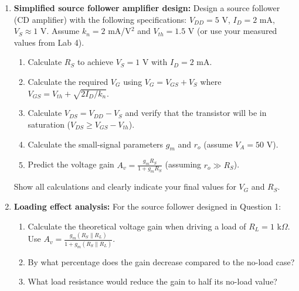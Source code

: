 \documentclass[10pt]{article}
\begin{document}
\begin{enumerate}
    
    \item \textbf{Simplified source follower amplifier design:} Design a source follower (CD amplifier) with the following specifications:  $V_{DD} = 5$ V, $I_D = 2$ mA, $V_S \approx 1$ V.  Assume $k_n = 2$ mA/V$^2$ and $V_{th} = 1.5$ V (or use your measured values from Lab 4).
    \begin{enumerate}
        \item Calculate $R_S$ to achieve $V_S = 1$ V with $I_D = 2$ mA. 
        \item Calculate the required $V_G$ using $V_G = V_{GS} + V_S$ where $V_{GS} = V_{th} + \sqrt{2I_D/k_n}$.
        \item Calculate $V_{DS} = V_{DD} - V_S$ and verify that the transistor will be in saturation ($V_{DS} \geq V_{GS} - V_{th}$). 
        \item Calculate the small-signal parameters $g_m$ and $r_o$ (assume $V_A = 50$ V).
        \item Predict the voltage gain $A_v = \frac{g_m R_S}{1 + g_m R_S}$ (assuming $r_o \gg R_S$).
    \end{enumerate}
    Show all calculations and clearly indicate your final values for $V_G$ and $R_S$.
    
    \item \textbf{Loading effect analysis:} For the source follower designed in Question 1:
    \begin{enumerate}
        \item Calculate the theoretical voltage gain when driving a load of $R_L = 1$ k$\Omega$.  Use $A_v = \frac{g_m (R_S \parallel R_L)}{1 + g_m (R_S \parallel R_L)}$.
        \item By what percentage does the gain decrease compared to the no-load case?
        \item What load resistance would reduce the gain to half its no-load value?
    \end{enumerate}
    
    
\end{enumerate}
\end{document}
